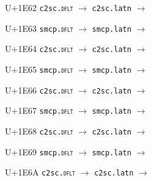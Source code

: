 \documentclass{article}
\begin{document}
\begin{substitutions}
\goodbreak

U+1E62  \linebreak
    \texttt{c2sc.\textsc{dflt}} $\to$  \linebreak
    \texttt{c2sc.latn} $\to$  

\goodbreak

U+1E63  \linebreak
    \texttt{smcp.\textsc{dflt}} $\to$  \linebreak
    \texttt{smcp.latn} $\to$  

\goodbreak

U+1E64  \linebreak
    \texttt{c2sc.\textsc{dflt}} $\to$  \linebreak
    \texttt{c2sc.latn} $\to$  

\goodbreak

U+1E65  \linebreak
    \texttt{smcp.\textsc{dflt}} $\to$  \linebreak
    \texttt{smcp.latn} $\to$  

\goodbreak

U+1E66  \linebreak
    \texttt{c2sc.\textsc{dflt}} $\to$  \linebreak
    \texttt{c2sc.latn} $\to$  

\goodbreak

U+1E67  \linebreak
    \texttt{smcp.\textsc{dflt}} $\to$  \linebreak
    \texttt{smcp.latn} $\to$  

\goodbreak

U+1E68  \linebreak
    \texttt{c2sc.\textsc{dflt}} $\to$  \linebreak
    \texttt{c2sc.latn} $\to$  

\goodbreak

U+1E69  \linebreak
    \texttt{smcp.\textsc{dflt}} $\to$  \linebreak
    \texttt{smcp.latn} $\to$  

\goodbreak

U+1E6A  \linebreak
    \texttt{c2sc.\textsc{dflt}} $\to$  \linebreak
    \texttt{c2sc.latn} $\to$  


\end{substitutions}
\end{document}
